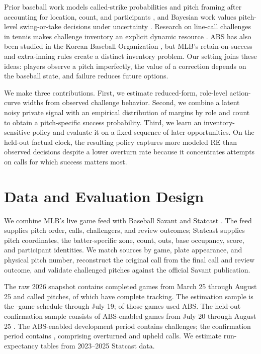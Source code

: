 \documentclass[12pt,letterpaper]{article}
\begin{document}
Prior baseball work models called-strike probabilities and pitch framing
after accounting for location, count, and participants
\citep{deshpande2017pitchframing}, and Bayesian work values pitch-level
swing-or-take decisions under uncertainty \citep{yee2024platediscipline}.
Research on line-call challenges in tennis makes challenge inventory an
explicit dynamic resource \citep{abramitzky2012linecalls}. ABS has also been
studied in the Korean Baseball Organization \citep{lee2025abs}, but MLB's
retain-on-success and extra-inning rules create a distinct inventory problem.
Our setting joins these ideas: players observe a pitch imperfectly, the value
of a correction depends on the baseball state, and failure reduces future
options.

We make three contributions. First, we estimate reduced-form, role-level
action-curve widths from observed challenge behavior. Second, we combine a
latent noisy private signal with an empirical distribution of margins by role
and count to obtain a pitch-specific success probability. Third, we learn an
inventory-sensitive policy and evaluate it on a fixed sequence of later
opportunities. On the held-out factual clock, the resulting policy captures
\RelativeGainPercent{} more modeled RE than observed decisions despite a lower
overturn rate because it concentrates attempts on calls for which success
matters most.

\section{Data and Evaluation Design}

We combine MLB's live game feed with Baseball Savant and Statcast
\citep{mlb2026statsapi,mlb2026savant}. The feed supplies pitch order, calls,
challengers, and review outcomes; Statcast supplies pitch coordinates, the
batter-specific zone, count, outs, base occupancy, score, and participant
identities. We match sources by game, plate appearance, and physical pitch
number, reconstruct the original call from the final call and review outcome,
and validate challenged pitches against the official Savant publication.

The raw 2026 snapshot contains \RawGames{} completed games from March 25
through August 25 and \RawCalledPitches{} called pitches, of which
\RawTrackedPitches{} have complete tracking. The estimation sample is the
\DevelopmentTrainingGames{}-game schedule through July 19; \DevelopmentGames{}
of those games used ABS. The held-out confirmation sample consists of
\ConfirmationGames{} ABS-enabled games from July 20 through August 25
\citep{castrovince2026absrules}. The ABS-enabled development period contains
\DevelopmentChallenges{} challenges; the confirmation period contains
\ConfirmationChallenges{}, comprising \ConfirmationOverturned{} overturned
and \ConfirmationUpheld{} upheld calls. We estimate run-expectancy tables from
2023--2025 Statcast data.
\end{document}
